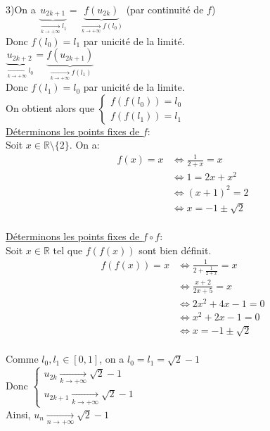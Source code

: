 \documentclass[10pt,a4paper]{article}
\theoremstyle{definition}
\begin{document}
3)On a $\underbrace{u_{2k + 1}}_{\xrightarrow[k \to +\infty]{} l_1} = \underbrace{f(u_{2k})}_{\xrightarrow[k \to +\infty]{} f(l_0)}$ (par continuité de $f$)\\
Donc $f(l_0) = l_1$ par unicité de la limité. \\
$\underbrace{u_{2k + 2}}_{\xrightarrow[k \to +\infty]{} l_0} = \underbrace{f(u_{2k+1})}_{\xrightarrow[k \to +\infty]{} f(l_1)}$ \\
Donc $f(l_1) = l_0$ par unicité de la limite. \\
On obtient alors que $\begin{cases}
f(f(l_0)) = l_0 \\ f(f(l_1)) = l_1
\end{cases}$ \\
\uline{Déterminons les points fixes de $f$}: \\
Soit $x \in \mathbb{R} \setminus \{ 2 \}$. On a:
\begin{align*}
f(x) = x &\iff \frac{1}{2 + x} = x \\
&\iff 1 = 2x + x^2 \\
&\iff (x + 1)^2 = 2 \\
&\iff x = -1 \pm \sqrt{2}
\end{align*} \\
\uline{Déterminons les points fixes de $f \circ f$}: \\
Soit $x \in \mathbb{R}$ tel que $f(f(x))$ sont bien définit.
\begin{align*}
f(f(x)) = x &\iff \frac{1}{2 + \frac{1}{2 + x}} = x \\
&\iff \frac{x + 2}{2x + 5} = x \\
&\iff 2x^2 + 4x - 1 = 0 \\
&\iff x^2 + 2x - 1 = 0 \\
&\iff x = -1 \pm \sqrt{2}
\end{align*} \\
Comme $l_0, l_1 \in [0, 1]$, on a $l_0 = l_1 = \sqrt{2} - 1$ \\
Donc $\begin{cases}
u_{2k} \xrightarrow[k \to +\infty]{} \sqrt{2} - 1 \\ u_{2k + 1} \xrightarrow[k \to +\infty]{} \sqrt{2} - 1\end{cases}$\\
Ainsi, $u_n \xrightarrow[n \to +\infty]{} \sqrt{2} - 1$
\end{document}
